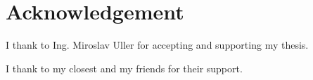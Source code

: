 \vspace{\fill}
\chapter*{Acknowledgement}
\vspace*{\fill}

I thank to Ing. Miroslav Uller for accepting and supporting my thesis. 

I thank to my closest and my friends for their support.
